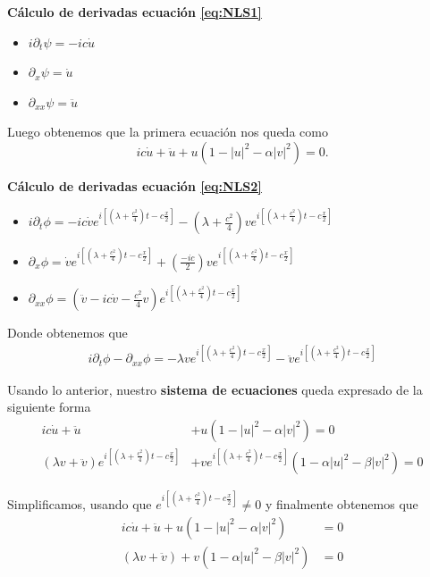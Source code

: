 \documentclass[letterpaper,11pt]{exam}
\theoremstyle{plain}
\begin{document}
\textbf{Cálculo de derivadas ecuación \eqref{eq:NLS1}}

\begin{itemize}
    \item $i\partial_t \psi=-i c \dot{u}$
    \item $\partial_x \psi=\dot{u}$
    \item $\partial_{xx} \psi=\ddot{u}$
\end{itemize}

Luego obtenemos que la primera ecuación nos queda como
\begin{equation*}
    ic\dot{u}+\ddot{u}+u(1-|u|^2-\alpha|v|^2)=0.
\end{equation*}

\textbf{Cálculo de derivadas ecuación \eqref{eq:NLS2}}

\begin{itemize}
    \item $i\partial_t\phi=-ic\dot{v}e^{i[(\lambda+\frac{c^2}{4})t-c\frac{x}{2}]}-(\lambda+\frac{c^2}{4})ve^{i[(\lambda+\frac{c^2}{4})t-c\frac{x}{2}]}$
    \item $\partial_x\phi=\dot{v}e^{i[(\lambda+\frac{c^2}{4})t-c\frac{x}{2}]}+(\frac{-ic}{2})ve^{i[(\lambda+\frac{c^2}{4})t-c\frac{x}{2}]}$
    \item $\partial_{xx} \phi
    = \left(\ddot{v} - ic\dot{v} - \tfrac{c^2}{4}v \right)
    e^{i\left[(\lambda+\frac{c^2}{4})t-c\frac{x}{2}\right]}$
\end{itemize}

Donde obtenemos que
\begin{align*}
    i\partial_{t}\phi-\partial_{xx}\phi=-\lambda ve^{i[(\lambda+\frac{c^2}{4})t-c\frac{x}{2}]}-\ddot{v}e^{i[(\lambda+\frac{c^2}{4})t-c\frac{x}{2}]}
\end{align*}

Usando lo anterior, nuestro \textbf{sistema de ecuaciones} queda expresado de la siguiente forma
\begin{align*}
     ic\dot{u}+\ddot{u}&+u(1-|u|^2-\alpha|v|^2)=0 \\
     (\lambda v +\ddot{v})e^{i[(\lambda+\frac{c^2}{4})t-c\frac{x}{2}]}&+v e^{i[(\lambda+\frac{c^2}{4})t-c\frac{x}{2}]}(1-\alpha |u|^2-\beta|v|^2)=0
\end{align*}

Simplificamos, usando que $e^{i[(\lambda+\frac{c^2}{4})t-c\frac{x}{2}]}\neq0$ y finalmente obtenemos que
  \begin{align*}
     ic\dot{u}+\ddot{u}+u(1-|u|^2-\alpha|v|^2)&=0 \\
     (\lambda v +\ddot{v})+v (1-\alpha |u|^2-\beta|v|^2)&=0
\end{align*}
\end{document}
